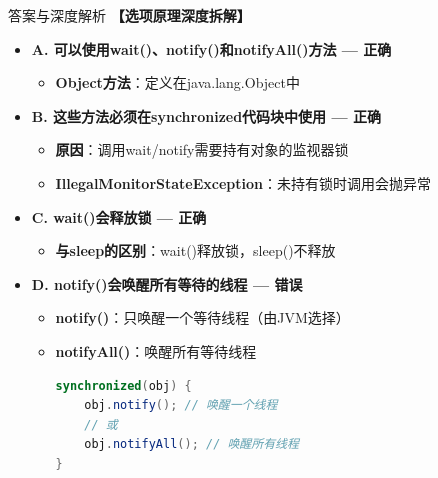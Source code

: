\documentclass[12pt, a4paper]{ctexart}
\begin{document}
\begin{enumerate}[label=\textbf{\arabic*.}]
\begin{bluebox}{答案与深度解析}
		      \textbf{【选项原理深度拆解】}
					  \begin{itemize}[label={}, leftmargin=*, nosep]

		      \item \textbf{A. 可以使用wait()、notify()和notifyAll()方法 — 正确}
		      \begin{itemize}[label={}, leftmargin=*, nosep]
			      \item \textbf{Object方法}：定义在java.lang.Object中
		      \end{itemize}

		      \item \textbf{B. 这些方法必须在synchronized代码块中使用 — 正确}
		      \begin{itemize}[label={}, leftmargin=*, nosep]
			      \item \textbf{原因}：调用wait/notify需要持有对象的监视器锁
			      \item \textbf{IllegalMonitorStateException}：未持有锁时调用会抛异常
		      \end{itemize}

		      \item \textbf{C. wait()会释放锁 — 正确}
		      \begin{itemize}[label={}, leftmargin=*, nosep]
			      \item \textbf{与sleep的区别}：wait()释放锁，sleep()不释放
		      \end{itemize}

		      \item \textbf{D. notify()会唤醒所有等待的线程 — 错误}
		      \begin{itemize}[label={}, leftmargin=*, nosep]
			      \item \textbf{notify()}：只唤醒一个等待线程（由JVM选择）
			      \item \textbf{notifyAll()}：唤醒所有等待线程
			            \begin{lstlisting}[language=Java]
synchronized(obj) {
    obj.notify(); // 唤醒一个线程
    // 或
    obj.notifyAll(); // 唤醒所有线程
}
      \end{lstlisting}
		      \end{itemize}

		      \end{itemize}


\end{bluebox}
\end{enumerate}
\end{document}
